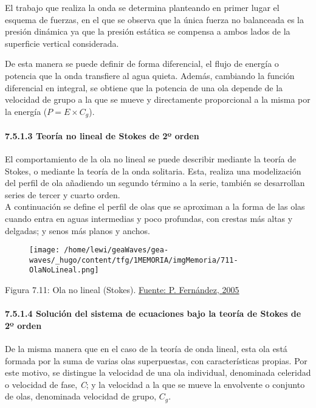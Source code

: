 El trabajo que realiza la onda se determina planteando en primer lugar
el esquema de fuerzas, en el que se observa que la única fuerza no
balanceada es la presión dinámica ya que la presión estática se compensa
a ambos lados de la superficie vertical considerada.

De esta manera se puede definir de forma diferencial, el flujo de
energía o potencia que la onda transfiere al agua quieta. Además,
cambiando la función diferencial en integral, se obtiene que la potencia
de una ola depende de la velocidad de grupo a la que se mueve y
directamente proporcional a la misma por la energía
(\(P=E \times C_g\)).

\paragraph{7.5.1.3 Teoría no lineal de Stokes de 2º
orden}\label{header-n260}

El comportamiento de la ola no lineal se puede describir mediante la
teoría de Stokes, o mediante la teoría de la onda solitaria. Esta,
realiza una modelización del perfil de ola añadiendo un segundo término
a la serie, también se desarrollan series de tercer y cuarto orden.\\

A continuación se define el perfil de olas que se aproximan a la forma
de las olas cuando entra en aguas intermedias y poco profundas, con
crestas más altas y delgadas; y senos más planos y anchos.

\begin{figure}
\centering
\texttt{[image: /home/lewi/geaWaves/gea-waves/\_hugo/content/tfg/1MEMORIA/imgMemoria/711-OlaNoLineal.png]}
\caption{}
\end{figure}

Figura 7.11: Ola no lineal (Stokes).
\href{http://files.pfernandezdiez.es/EnergiasAlternativas/mar/PDFs/01Olas.pdf}{Fuente:
P. Fernández, 2005}

\paragraph{7.5.1.4 Solución del sistema de ecuaciones bajo la teoría de
Stokes de 2º orden}\label{header-n269}

De la misma manera que en el caso de la teoría de onda lineal, esta ola
está formada por la suma de varias olas superpuestas, con
características propias. Por este motivo, se distingue la velocidad de
una ola individual, denominada celeridad o velocidad de fase, \emph{C};
y la velocidad a la que se mueve la envolvente o conjunto de olas,
denominada velocidad de grupo, \(C_g\).

